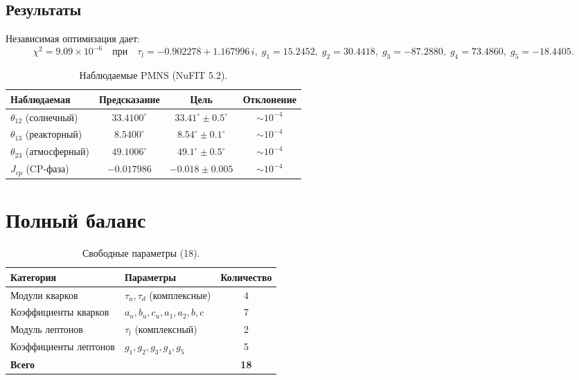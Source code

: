 \documentclass[12pt,a4paper]{article}
\numberwithin{equation}{section}
\begin{document}
\subsection{Результаты}
Независимая оптимизация дает:
\begin{equation}
\boxed{\;\chi^2 = 9.09\times10^{-6}
\quad\text{при}\quad
\tau_l = -0.902278 + 1.167996\,i,\;
g_1 = 15.2452,\; g_2 = 30.4418,\; g_3 = -87.2880,\; g_4 = 73.4860,\; g_5 = -18.4405.\;}
\end{equation}

\begin{table}[H]
\centering
\caption{Наблюдаемые PMNS (NuFIT 5.2).}
\begin{tabular}{lccc}
\toprule
Наблюдаемая & Предсказание & Цель & Отклонение \\
\midrule
$\theta_{12}$ (солнечный)    & $33.4100^\circ$ & $33.41^\circ \pm 0.5^\circ$ & $\sim 10^{-4}$ \\
$\theta_{13}$ (реакторный)   & $8.5400^\circ$  & $8.54^\circ \pm 0.1^\circ$  & $\sim 10^{-4}$ \\
$\theta_{23}$ (атмосферный)  & $49.1006^\circ$ & $49.1^\circ \pm 0.5^\circ$  & $\sim 10^{-4}$ \\
$J_{cp}$ (CP-фаза)           & $-0.017986$     & $-0.018 \pm 0.005$          & $\sim 10^{-4}$ \\
\bottomrule
\end{tabular}
\end{table}

\section{Полный баланс}
\label{sec:balance}

\begin{table}[H]
\centering
\caption{Свободные параметры (18).}
\begin{tabular}{llc}
\toprule
Категория & Параметры & Количество \\
\midrule
Модули кварков & $\tau_u, \tau_d$ (комплексные) & 4 \\
Коэффициенты кварков & $a_u, b_u, c_u, a_1, a_2, b, c$ & 7 \\
Модуль лептонов & \(\tau_l\) (комплексный) & 2 \\
Коэффициенты лептонов & $g_1, g_2, g_3, g_4, g_5$ & 5 \\
\midrule
\textbf{Всего} & & \textbf{18} \\
\bottomrule
\end{tabular}
\end{table}
\end{document}
